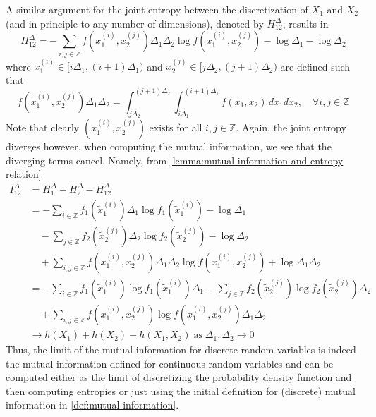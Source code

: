 \documentclass[../Thesis.tex]{subfiles}
\begin{document}
A similar argument for the joint entropy between the discretization of $X_1$ and $X_2$ (and in principle to any number of dimensions), denoted by $H^{\Delta}_{12}$, results in
$$H^{\Delta}_{12} = -\sum_{i,j \in \mathbb{Z}} f\left(x_1^{(i)}, x_2^{(j)}\right) \Delta_1 \Delta_2 \log{f\left(x_1^{(i)}, x_2^{(j)}\right)} - \log{\Delta_1} - \log{\Delta_2}$$
where $x_1^{(i)}\in[i\Delta_1, (i+1)\Delta_1)$ and $x_2^{(j)}\in [j\Delta_2, (j+1)\Delta_2)$ are defined such that
$$f\left(x_1^{(i)}, x_2^{(j)}\right)\Delta_1 \Delta_2 = \int_{j\Delta_2}^{(j+1)\Delta_2}\int_{i\Delta_1}^{(i+1)\Delta_1} f(x_1,x_2) \, dx_1 dx_2,\quad \forall i,j\in\mathbb{Z}$$
Note that clearly $\left(x_1^{(i)},x_2^{(j)}\right)$ exists for all $i,j\in \mathbb{Z}$. Again, the joint entropy diverges however, when computing the mutual information, we see that the diverging terms cancel. Namely, from \autoref{lemma:mutual information and entropy relation}
\begin{align*}
    I^{\Delta}_{12} & = H^{\Delta}_1 + H^{\Delta}_2 - H^{\Delta}_{12}                                                                                                                                                                      \\
                    & = -\sum_{i\in\mathbb{Z}} f_1\left(\tilde{x}_1^{(i)}\right) \Delta_1 \log{f_1\left(\tilde{x}_1^{(i)}\right)} - \log{\Delta_1}                                                                                         \\
                    & \quad - \sum_{j\in\mathbb{Z}} f_2\left(\tilde{x}_2^{(j)}\right) \Delta_2 \log{f_2\left(\tilde{x}_2^{(j)}\right)} - \log{\Delta_2}                                                                                    \\
                    & \quad + \sum_{i,j\in\mathbb{Z}} f\left(x_1^{(i)},x_2^{(j)}\right) \Delta_1 \Delta_2 \log{f\left(x_1^{(i)},x_2^{(j)}\right)} + \log{\Delta_1 \Delta_2}                                                                \\
                    & =-\sum_{i\in\mathbb{Z}} f_1\left(\tilde{x}_1^{(i)}\right) \log{f_1\left(\tilde{x}_1^{(i)}\right)}\Delta_1 - \sum_{j\in\mathbb{Z}} f_2\left(\tilde{x}_2^{(j)}\right)  \log{f_2\left(\tilde{x}_2^{(j)}\right)}\Delta_2 \\
                    & \quad +\sum_{i,j\in\mathbb{Z}} f\left(x_1^{(i)},x_2^{(j)}\right) \log{f\left(x_1^{(i)},x_2^{(j)}\right)} \Delta_1 \Delta_2                                                                                           \\
                    & \to h(X_1) + h(X_2) - h(X_1,X_2)\; \text{as}\; \Delta_1,\Delta_2 \to 0
\end{align*}
Thus, the limit of the mutual information for discrete random variables is indeed the mutual information defined for continuous random variables and can be computed either as the limit of discretizing the probability density function and then computing entropies or just using the initial definition for (discrete) mutual information in \autoref{def:mutual information}.
\end{document}
